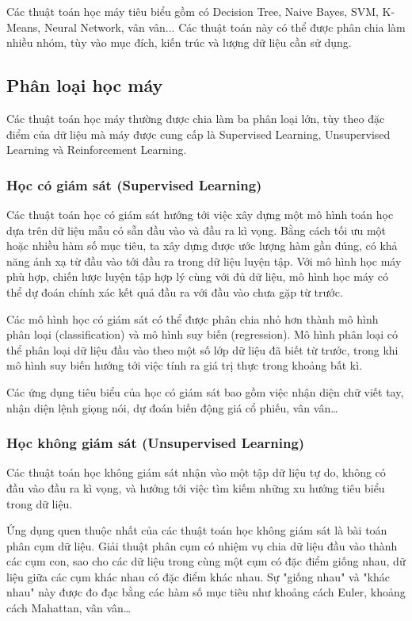 \documentclass[12pt]{extreport}
\begin{document}
Các thuật toán học máy tiêu biểu gồm có Decision Tree, Naive Bayes, SVM, K-Means, Neural Network, vân vân... Các thuật toán này có thể được phân chia làm nhiều nhóm, tùy vào mục đích, kiến trúc và lượng dữ liệu cần sử dụng.

\subsection{Phân loại học máy}

Các thuật toán học máy thường được chia làm ba phân loại lớn, tùy theo đặc điểm của dữ liệu mà máy được cung cấp là Supervised Learning, Unsupervised Learning và Reinforcement Learning.

\subsubsection{Học có giám sát (Supervised Learning)}

Các thuật toán học có giám sát hướng tới việc xây dựng một mô hình toán học dựa trên dữ liệu mẫu có sẵn đầu vào và đầu ra kì vọng. Bằng cách tối ưu một hoặc nhiều hàm số mục tiêu, ta xây dựng được ước lượng hàm gần đúng, có khả năng ánh xạ từ đầu vào tới đầu ra trong dữ liệu luyện tập. Với mô hình học máy phù hợp, chiến lược luyện tập hợp lý cùng với đủ dữ liệu, mô hình học máy có thể dự đoán chính xác kết quả đầu ra với đầu vào chưa gặp từ trước.

Các mô hình học có giám sát có thể được phân chia nhỏ hơn thành mô hình phân loại (classification) và mô hình suy biến (regression). Mô hình phân loại có thể phân loại dữ liệu đầu vào theo một số lớp dữ liệu đã biết từ trước, trong khi mô hình suy biến hướng tới việc tính ra giá trị thực trong khoảng bất kì.

Các ứng dụng tiêu biểu của học có giám sát bao gồm việc nhận diện chữ viết tay, nhận diện lệnh giọng nói, dự đoán biến động giá cổ phiếu, vân vân\dots

\subsubsection{Học không giám sát (Unsupervised Learning)}

Các thuật toán học không giám sát nhận vào một tập dữ liệu tự do, không có đầu vào đầu ra kì vọng, và hướng tới việc tìm kiếm những xu hướng tiêu biểu trong dữ liệu.

Ứng dụng quen thuộc nhất của các thuật toán học không giám sát là bài toán phân cụm dữ liệu. Giải thuật phân cụm có nhiệm vụ chia dữ liệu đầu vào thành các cụm con, sao cho các dữ liệu trong cùng một cụm có đặc điểm giống nhau, dữ liệu giữa các cụm khác nhau có đặc điểm khác nhau. Sự "giống nhau" và "khác nhau" này được đo đạc bằng các hàm số mục tiêu như khoảng cách Euler, khoảng cách Mahattan, vân vân\dots
\end{document}
